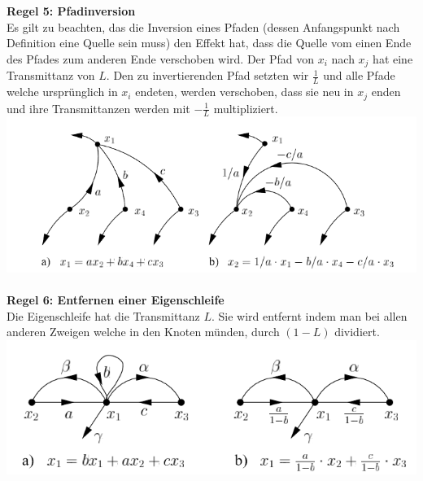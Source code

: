 \noindent\textbf{Regel 5: Pfadinversion}\\
 Es gilt zu beachten, das die Inversion eines Pfaden (dessen
Anfangspunkt nach Definition eine Quelle sein muss) den Effekt
hat, dass die Quelle vom einen Ende des Pfades zum
anderen Ende verschoben wird. Der Pfad von $x_i$ nach $x_j$ hat
eine Transmittanz von $L$. Den zu invertierenden Pfad setzten
wir $\frac{1}{L}$ und alle Pfade welche ursprünglich in $x_i$ endeten,
werden verschoben, dass sie neu in $x_j$ enden und ihre Transmittanzen
werden mit $-\frac{1}{L}$ multipliziert.\\
\includegraphics[width=\columnwidth]{Images/sfd_r5}~\\

\noindent\textbf{Regel 6: Entfernen einer Eigenschleife}\\
 Die Eigenschleife hat die Transmittanz $L$. Sie wird entfernt
indem man bei allen anderen Zweigen welche in den Knoten
münden, durch $(1 - L)$ dividiert.\\
\includegraphics[width=\columnwidth]{Images/sfd_r6}~\\


